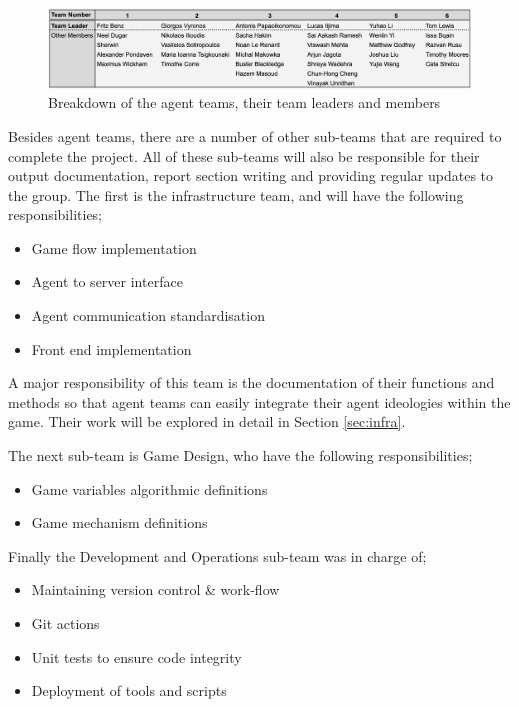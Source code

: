 \begin{figure}[htb]
    \centering
    \includegraphics[scale=0.50]{000_introduction/images/subteams.png}
    \caption{Breakdown of the agent teams, their team leaders and members}
    \label{fig:agentteams}
\end{figure}
    
Besides agent teams, there are a number of other sub-teams that are required to complete the project. All of these sub-teams will also be responsible for their output documentation, report section writing and providing regular updates to the group. 
The first is the infrastructure team, and will have the following responsibilities;

\begin{itemize}
    \item Game flow implementation
    \item Agent to server interface
    \item Agent communication standardisation
    \item Front end implementation
\end{itemize}

A major responsibility of this team is the documentation of their functions and methods so that agent teams can easily integrate their agent ideologies within the game. Their work will be explored in detail in Section \ref{sec:infra}.

The next sub-team is Game Design, who have the following responsibilities;

\begin{itemize}
    \item Game variables algorithmic definitions
    \item Game mechanism definitions 
\end{itemize}

Finally the Development and Operations sub-team was in charge of;

\begin{itemize}
    \item Maintaining version control \& work-flow
    \item Git actions
    \item Unit tests to ensure code integrity
    \item Deployment of tools and scripts
\end{itemize}

